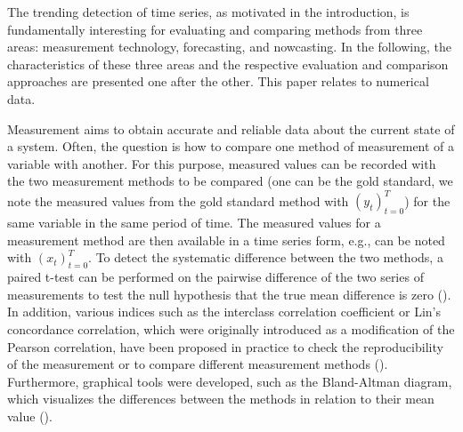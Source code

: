 
The trending detection of time series, as motivated in the introduction, is fundamentally interesting for evaluating and comparing methods from three areas: measurement technology, forecasting, and nowcasting. In the following, the characteristics of these three areas and the respective evaluation and comparison approaches are presented one after the other.
This paper relates to numerical data.  

Measurement aims to obtain accurate and reliable data about the current state of a system.
Often, the question is how to compare one method of measurement of a variable with another.
For this purpose, measured values can be recorded with the two measurement methods to be compared (one can be the gold standard, we note the measured values from the gold standard method with $(y_t)^T_{t=0}$) for the same variable in the same period of time.
The measured values for a measurement method are then available in a time series form, e.g., can be noted with $(x_t)^T_{t=0}$.
To detect the systematic difference between the two methods, a paired t-test can be performed on the pairwise difference of the two series of measurements to test the null hypothesis that the true mean difference is zero (\cite{watson2010method}).
In addition, various indices such as the interclass correlation coefficient or Lin's concordance correlation, which were originally introduced as a modification of the Pearson correlation, have been proposed in practice to check the reproducibility of the measurement or to compare different measurement methods (\cite{lawrence1989concordance,koo2016guideline,}). 
Furthermore, graphical tools were developed, such as the Bland-Altman diagram, which visualizes the differences between the methods in relation to their mean value (\cite{bland1986statistical}).

